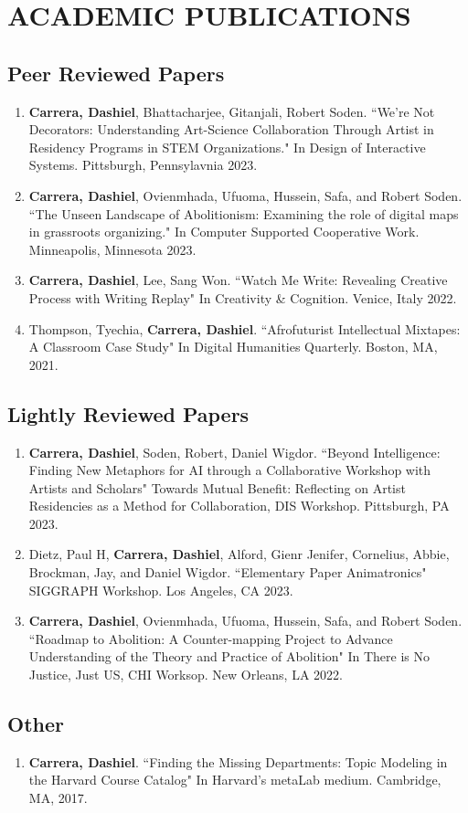 \section{ACADEMIC PUBLICATIONS}

\subsection{Peer Reviewed Papers}
 \begin{enumerate}
  \item \textbf{Carrera, Dashiel}, Bhattacharjee, Gitanjali, Robert Soden. ``We're Not Decorators: Understanding Art-Science Collaboration Through Artist in Residency Programs in STEM Organizations." In Design of Interactive Systems. Pittsburgh, Pennsylavnia 2023. \\
  \item \textbf{Carrera, Dashiel}, Ovienmhada, Ufuoma, Hussein, Safa, and Robert Soden. ``The Unseen Landscape of Abolitionism: Examining the role of digital maps in
grassroots organizing."  In Computer Supported Cooperative Work. Minneapolis, Minnesota 2023.\\
  \item \textbf{Carrera, Dashiel}, Lee, Sang Won. ``Watch Me Write: Revealing Creative Process with Writing Replay" In Creativity \& Cognition. Venice, Italy 2022. \\
  \item Thompson, Tyechia, \textbf{Carrera, Dashiel}. ``Afrofuturist Intellectual Mixtapes: A Classroom Case Study" In Digital Humanities Quarterly. Boston, MA, 2021.\
 \end{enumerate}

\subsection{Lightly Reviewed Papers}
\begin{enumerate}
  \item \textbf{Carrera, Dashiel}, Soden, Robert, Daniel Wigdor. ``Beyond Intelligence: Finding New Metaphors for AI through a Collaborative Workshop with Artists and Scholars" Towards Mutual Benefit: Reflecting on Artist Residencies as a Method for Collaboration, DIS Workshop. Pittsburgh, PA 2023. \\
   \item  Dietz, Paul H, \textbf{Carrera, Dashiel}, Alford, Gienr Jenifer, Cornelius, Abbie, Brockman, Jay, and Daniel Wigdor. ``Elementary Paper Animatronics" SIGGRAPH Workshop. Los Angeles, CA 2023. \\
  \item \textbf{Carrera, Dashiel}, Ovienmhada, Ufuoma, Hussein, Safa, and Robert Soden. ``Roadmap to Abolition: A Counter-mapping Project to Advance Understanding of the Theory and Practice of Abolition" In There is No Justice, Just US, CHI Worksop. New Orleans, LA 2022. 
  \end{enumerate}
  
\subsection{Other}
\begin{enumerate}
\item \textbf{Carrera, Dashiel}. ``Finding the Missing Departments: Topic Modeling in the Harvard Course Catalog" In Harvard's metaLab medium. Cambridge, MA, 2017.\\
\end{enumerate} 



